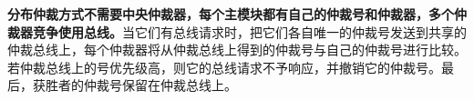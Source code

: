 \textbf{分布仲裁方式不需要中央仲裁器，每个主模块都有自己的仲裁号和仲裁器，多个仲裁器竞争使用总线。}当它们有总线请求时，把它们各自唯一的仲裁号发送到共享的仲裁总线上，每个仲裁器将从仲裁总线上得到的仲裁号与自己的仲裁号进行比较。若仲裁总线上的号优先级高，则它的总线请求不予响应，并撤销它的仲裁号。最后，{获胜者的仲裁号保留在仲裁总线上}。
